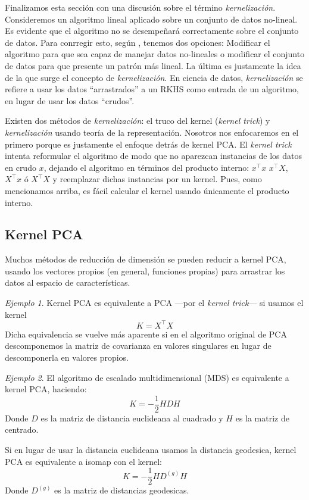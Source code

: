 \documentclass{article}
\numberwithin{equation}{section}
\theoremstyle{remark}
\newtheorem{example}{Ejemplo}
\theoremstyle{definition}
\theoremstyle{remark}
\theoremstyle{remark}
\begin{document}
Finalizamos esta sección con una discusión sobre el término \textit{kernelización}.
Consideremos un algoritmo lineal aplicado sobre un conjunto de datos no-lineal. Es evidente que
el algoritmo no se desempeñará correctamente sobre el conjunto de datos. Para conrregir esto,
según \parencite{Ghojogh_Elements}, tenemos dos opciones: Modificar el algoritmo para que sea
capaz de manejar datos no-lineales o modificar el conjunto de datos para que presente un patrón
más lineal. La última es justamente la idea de la que surge el concepto de \textit{kernelización}.
En ciencia de datos, \textit{kernelización} se refiere a usar los datos ``arrastrados'' a un RKHS
como entrada de un algoritmo, en lugar de usar los datos ``crudos''.

Existen dos métodos de \textit{kernelización}: el truco del kernel (\textit{kernel trick}) y 
\textit{kernelización} usando teoría de la representación. Nosotros nos enfocaremos en el primero
porque es justamente el enfoque detrás de kernel PCA.
El \textit{kernel trick} intenta reformular el algoritmo de modo que no aparezcan instancias
de los datos en crudo $x$, dejando el algoritmo en términos del producto interno: $x^\intercal x$
$x^\intercal X$, $X^\intercal x$ ó $X^\intercal X$ y reemplazar dichas instancias por un kernel. Pues, como mencionamos arriba, es fácil
calcular el kernel usando únicamente el producto interno.

\subsection{Kernel PCA}
\label{ss:kernel_pca}

Muchos métodos de reducción de dimensión se pueden reducir a kernel PCA, usando los vectores propios
(en general, funciones propias) para arrastrar los datos al espacio de características. 


\begin{example}
    \label{ex:kpca_pca}
    Kernel PCA es equivalente a PCA ---por el \textit{kernel trick}---  si usamos el kernel
    $$K = X^\intercal X$$
    Dicha equivalencia se vuelve más aparente si en el algoritmo original de PCA descomponemos
    la matriz de covarianza en valores singulares en lugar de descomponerla en valores propios.
\end{example}

\begin{example}
    \label{ex:kpca_isomap_mds}
    El algoritmo de escalado multidimensional (MDS) es equivalente a kernel PCA, haciendo:
    $$K = -\frac{1}{2}HDH$$
    Donde $D$ es la matriz de distancia euclideana al cuadrado y $H$ es la matriz de centrado.

    Si en lugar de usar la distancia euclideana usamos la distancia geodesica, kernel PCA es 
    equivalente a isomap con el kernel:
    $$K = -\frac{1}{2} H D^{(g)}H$$
    Donde $D^{(g)}$ es la matriz de distancias geodesicas.
\end{example}
\end{document}
